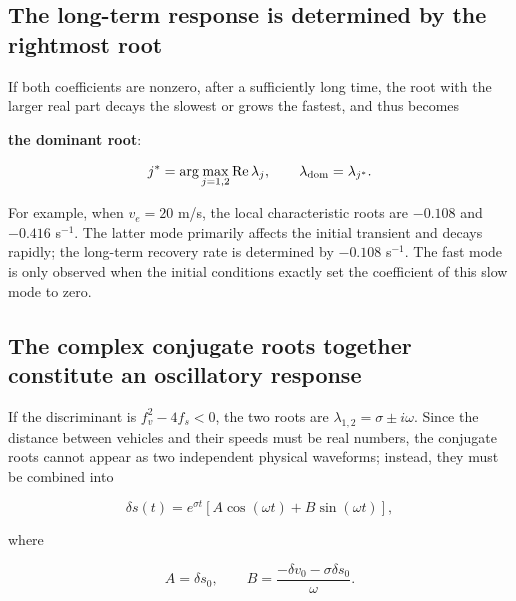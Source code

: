 \documentclass[11pt,a4paper,openany]{book}
\numberwithin{equation}{chapter}
\numberwithin{figure}{chapter}
\numberwithin{table}{chapter}
\begin{document}
\subsection{The long-term response is determined by the rightmost root}










If both coefficients are nonzero, after a sufficiently long time, the root with the larger real part decays the slowest or grows the fastest, and thus becomes




\textbf{the dominant root}:

\begin{equation}
j^*=\arg\max_{j=1,2}\operatorname{Re}\lambda_j,
\qquad
\lambda_{\rm dom}=\lambda_{j^*}.
\end{equation}

For example, when $v_e=20$ m/s, the local characteristic roots are $-0.108$ and $-0.416$ s$^{-1}$. The latter mode primarily affects the initial transient and decays rapidly; the long-term recovery rate is determined by $-0.108$ s$^{-1}$. The fast mode is only observed when the initial conditions exactly set the coefficient of this slow mode to zero.










\subsection{The complex conjugate roots together constitute an oscillatory response}





If the discriminant is $f_v^2-4f_s<0$, the two roots are $\lambda_{1,2}=\sigma\pm i\omega$. Since the distance between vehicles and their speeds must be real numbers, the conjugate roots cannot appear as two independent physical waveforms; instead, they must be combined into

\begin{equation}
\boxed{
\delta s(t)=e^{\sigma t}
\left[A\cos(\omega t)+B\sin(\omega t)\right],}
\label{eq:local-real-oscillation}
\end{equation}

where

\begin{equation}
A=\delta s_0,
\qquad
B=\frac{-\delta v_0-\sigma\delta s_0}{\omega}.
\end{equation}
\end{document}
